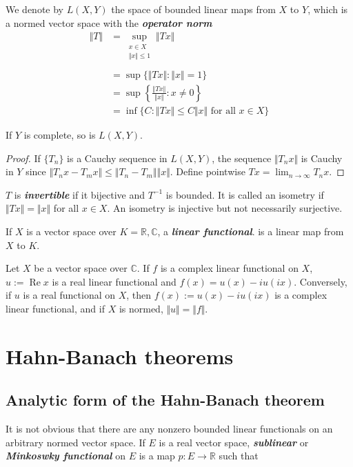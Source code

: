 \documentclass{article}
\theoremstyle{definition}
\numberwithin{equation}{section}
\newcommand{\R}{\mathbb{R}}
\newcommand{\C}{\mathbb{C}}
\begin{document}
We denote by $L(X,Y)$ the space of bounded linear maps from $X$ to $Y$, which is a normed vector space with the \textbf{\textit{operator norm}}
\begin{align*}
	\Vert T\Vert&=\sup_{\substack{x\in X\\\Vert x\Vert\leq1}}\Vert Tx\Vert\\\\
	&=\sup\{\Vert Tx\Vert:\Vert x\Vert=1\}\\
	&=\sup\left\{\frac{\Vert Tx\Vert}{\Vert x\Vert}:x\neq0\right\}\\
	&=\inf\{C:\Vert Tx\Vert\leq C\Vert x\Vert \text{ for all }x\in X\}
\end{align*}
\begin{prop}
	If $Y$ is complete, so is $L(X,Y)$.
\end{prop}
\begin{proof}
	If $\{T_n\}$ is a Cauchy sequence in $L(X,Y)$, the sequence $\Vert T_nx\Vert$ is Cauchy in $Y$ since $\Vert T_nx-T_mx\Vert\leq\Vert T_n-T_m\Vert\Vert x\Vert$. Define pointwise $Tx=\lim_{n\to\infty}T_nx$.
\end{proof}
$T$ is \textbf{\textit{invertible}} if it bijective and $T^{-1}$ is bounded. It is called an isometry if $\Vert Tx\Vert=\Vert x\Vert$ for all $x\in X$. An isometry is injective but not necessarily surjective.

If $X$ is a vector space over $K=\R,\C$, a \textbf{\textit{linear functional}}. is a linear map from $X$ to $K$.

\begin{prop}
	Let $X$ be a vector space over $\C$. If $f$ is a complex linear functional on $X$,
	$u:=\operatorname{Re}x$ is a real linear functional and $f(x)=u(x)-iu(ix)$.
	Conversely, if $u$ is a real functional on $X$, then $f(x):=u(x)-iu(ix)$ is a complex linear functional, and if $X$ is normed, $\Vert u\Vert=\Vert f\Vert$.
\end{prop}

\section{Hahn-Banach theorems}

\subsection{Analytic form of the Hahn-Banach theorem}
It is not obvious that there are any nonzero bounded linear functionals on an arbitrary normed vector space. If $E$ is a real vector space, \textbf{\textit{sublinear}} or \textbf{\textit{Minkoswky functional}} on $E$ is a map $p:E\to\R$ such that
\end{document}
